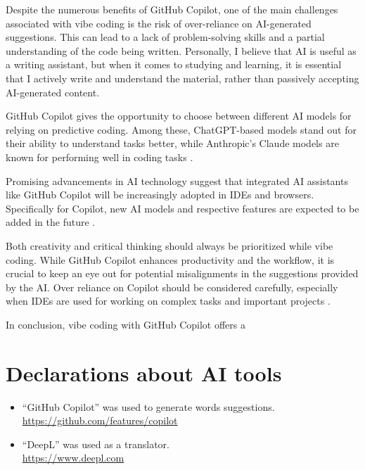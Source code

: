 \documentclass{article}
\begin{document}
Despite the numerous benefits of GitHub Copilot, one of the main challenges associated
with vibe coding is the risk of over-reliance on AI-generated suggestions. This can
lead to a lack of problem-solving skills and a partial understanding of the code being
written. Personally, I believe that AI is useful as a writing assistant, but when it
comes to studying and learning, it is essential that I actively write and understand the
material, rather than passively accepting AI-generated content.
\vspace*{.25cm}

GitHub Copilot gives the opportunity to choose between different AI models for relying
on predictive coding. Among these, ChatGPT-based models stand out for their ability to
understand tasks better, while Anthropic's Claude models are known for performing well
in coding tasks \parencite{github-models}.
\vspace*{.25cm}

Promising advancements in AI technology suggest that integrated AI assistants like
GitHub Copilot will be increasingly adopted in IDEs and browsers. Specifically for
Copilot, new AI models and respective features are expected to be added in the future
\parencite{github-discussion}.
\vspace*{.25cm}

Both creativity and critical thinking should always be prioritized while vibe coding.
While GitHub Copilot enhances productivity and the workflow, it is crucial to keep
an eye out for potential misalignments in the suggestions provided by the AI.
Over reliance on Copilot should be considered carefully, especially when IDEs are used
for working on complex tasks and important projects \parencite{github-guide}.

In conclusion, vibe coding with GitHub Copilot offers a 

\vfill
\setlength{\bibitemsep}{1.2\baselineskip}
\printbibliography[title={References}]

\section*{Declarations about AI tools}
\begin{itemize}
    \item ``GitHub Copilot'' was used to generate words suggestions.\\
        \url{https://github.com/features/copilot}
    \item ``DeepL'' was used as a translator.\\
        \url{https://www.deepl.com}
\end{itemize}
\end{document}
